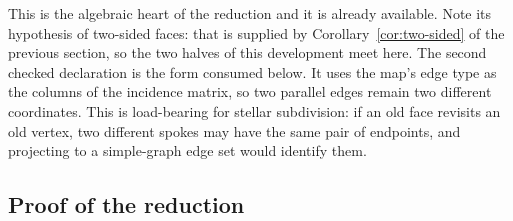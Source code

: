 This is the algebraic heart of the reduction and it is already available.
Note its hypothesis of two-sided faces: that is supplied by
Corollary~\ref{cor:two-sided} of the previous section, so the two halves of
this development meet here.  The second checked declaration is the form
consumed below.  It uses the map's edge type as the columns of the incidence
matrix, so two parallel edges remain two different coordinates.  This is
load-bearing for stellar subdivision: if an old face revisits an old vertex,
two different spokes may have the same pair of endpoints, and projecting to
a simple-graph edge set would identify them.

\subsection{Proof of the reduction}


